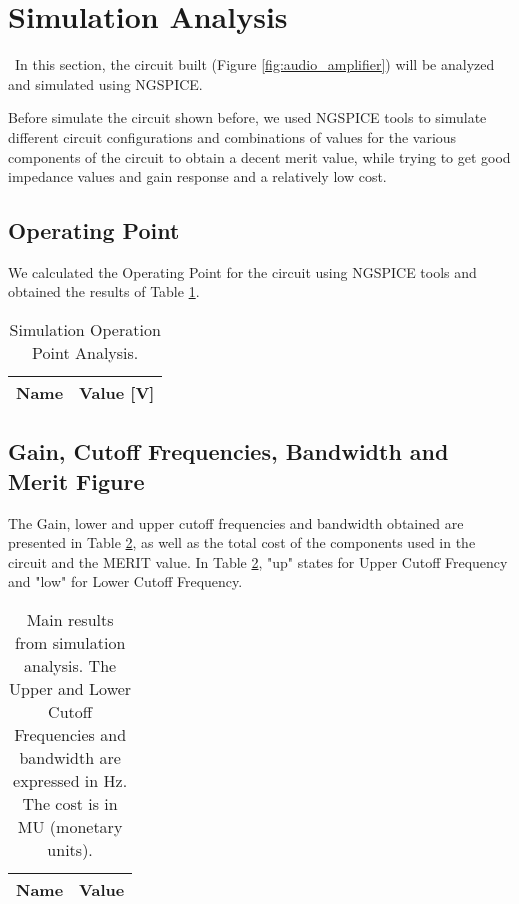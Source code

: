 \newpage
{}
\section{Simulation Analysis}
\label{sec:simulation}

~In this section, the circuit built (Figure \ref{fig:audio_amplifier}) will be analyzed and simulated using NGSPICE. 

Before simulate the circuit shown before, we used NGSPICE tools to simulate different circuit configurations and combinations of values for the various components of the circuit to obtain a decent merit value, while trying to get good impedance values and gain response and a relatively low cost. \par


\subsection{Operating Point}

We calculated the Operating Point for the circuit using NGSPICE tools and obtained the results of Table \ref{tab:sim_op}.

\begin{table}[H]
	\centering
	\begin{tabular}{|l|r|}
		\hline    
		{\bf Name } & {\bf Value [V]} \\ \hline
		
	\end{tabular}
	\caption{Simulation Operation Point Analysis.}
	\label{tab:sim_op}
\end{table}


\subsection{Gain, Cutoff Frequencies, Bandwidth and Merit Figure}

The Gain, lower and upper cutoff frequencies and bandwidth obtained are presented in Table \ref{tab:sim_results}, as well as the total cost of the components used in the circuit and the MERIT value. In Table \ref{tab:sim_results}, "up" states for Upper Cutoff Frequency and "low" for Lower Cutoff Frequency.

\begin{table}[H]
	\centering
	\begin{tabular}{|l|r|}
		\hline    
		{\bf Name} & {\bf Value} \\ \hline
		
	\end{tabular}
	\caption{Main results from simulation analysis. The Upper and Lower Cutoff Frequencies and bandwidth are expressed in Hz. The cost is in MU (monetary units).}
	\label{tab:sim_results}
\end{table}

